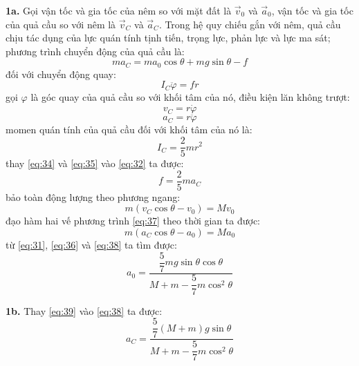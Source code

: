 \noindent\textbf{1a. } Gọi vận tốc và gia tốc của nêm so với mặt đất là $\vec{v}_{0}$ và $\vec{a}_{0}$, vận tốc và gia tốc của quả cầu so với nêm là $\vec{v}_{C}$ và $\vec{a}_{C}$. Trong hệ quy chiếu gắn với nêm, quả cầu chịu tác dụng của lực quán tính tịnh tiến, trọng lực, phản lực và lực ma sát; phương trình chuyển động của quả cầu là:
\begin{equation}
  \label{eq:31}
  ma_{C}=ma_{0}\cos\theta+mg\sin\theta-f
\end{equation}
đối với chuyển động quay:
\begin{equation}
  \label{eq:32}
  I_{C}\ddot{\varphi}=fr
\end{equation}
gọi $\varphi$ là góc quay của quả cầu so với khối tâm của nó, điều kiện lăn không trượt:
\begin{equation}
  \label{eq:33}
  v_{C}=r\dot{\varphi}
\end{equation}
\begin{equation}
  \label{eq:34}
  a_{C}=r\ddot{\varphi}
\end{equation}
momen quán tính của quả cầu đối với khối tâm của nó là:
\begin{equation}
  \label{eq:35}
  I_{C}=\frac{2}{5}mr^{2}
\end{equation}
thay \eqref{eq:34} và \eqref{eq:35} vào \eqref{eq:32} ta được:
\begin{equation}
  \label{eq:36}
  f=\frac{2}{5}ma_{C}
\end{equation}
bảo toàn động lượng theo phương ngang:
\begin{equation}
  \label{eq:37}
  m(v_{C}\cos\theta-v_{0})=Mv_{0}
\end{equation}
đạo hàm hai vế phương trình \eqref{eq:37} theo thời gian ta được:
\begin{equation}
  \label{eq:38}
  m(a_{C}\cos\theta-a_{0})=Ma_{0}
\end{equation}
từ \eqref{eq:31}, \eqref{eq:36} và \eqref{eq:38} ta tìm được:
\begin{equation}
  \label{eq:39}
  a_{0}=\frac{\dfrac{5}{7}mg\sin\theta\cos\theta}{M+m-\dfrac{5}{7}m\cos^{2}\theta}
\end{equation}

\noindent\textbf{1b.} Thay \eqref{eq:39} vào \eqref{eq:38} ta được:
\begin{equation}
  \label{eq:310}
  a_{C}=\frac{\dfrac{5}{7}(M+m)g\sin\theta}{M+m-\dfrac{5}{7}m\cos^{2}\theta}
\end{equation}

